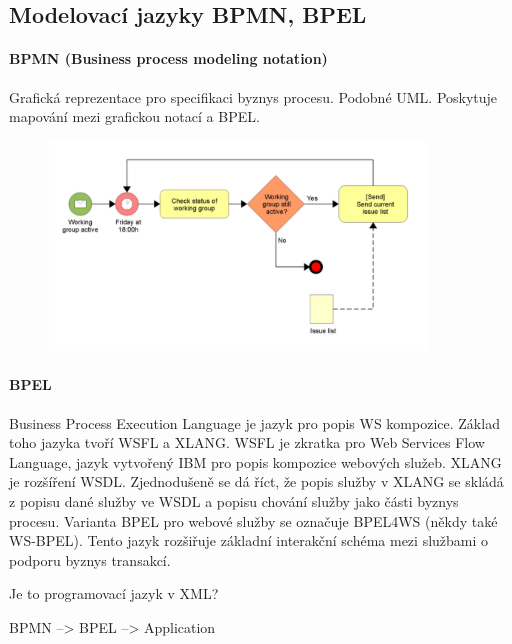 \subsection{Modelovací jazyky BPMN, BPEL}

\paragraph{BPMN (Business process modeling notation)} Grafická reprezentace pro specifikaci byznys procesu. Podobné UML. Poskytuje mapování mezi grafickou notací a BPEL.

\begin{figure}[h!]
\centering
\includegraphics[width=100mm]{11/images/bpmn}
\end{figure}

\paragraph{BPEL} Business Process Execution Language je jazyk pro popis WS kompozice. Základ toho jazyka tvoří WSFL a XLANG. WSFL je zkratka pro Web Services Flow Language, jazyk vytvořený IBM pro popis kompozice webových služeb. XLANG je rozšíření WSDL. Zjednodušeně se dá říct, že popis služby v XLANG se skládá z popisu dané služby ve WSDL a popisu chování služby jako části byznys procesu. Varianta BPEL pro webové služby se označuje BPEL4WS (někdy také WS-BPEL). Tento jazyk rozšiřuje základní interakční schéma mezi službami o podporu byznys transakcí.

Je to programovací jazyk v XML?

BPMN --> BPEL --> Application
